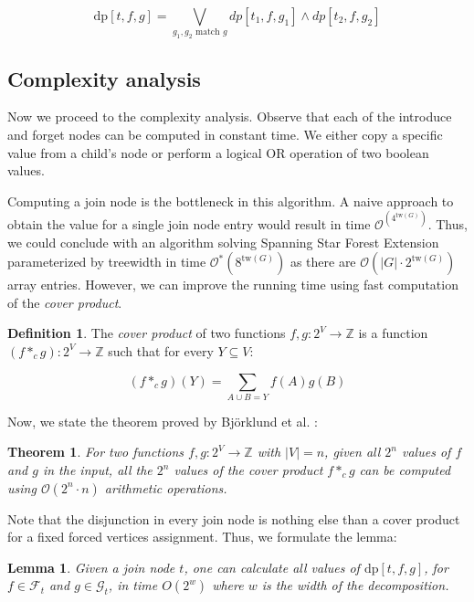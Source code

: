 \documentclass[en]{pracamgr}
\newtheorem{theorem}{Theorem}
\newtheorem{lemma}{Lemma}
\theoremstyle{definition}
\newtheorem{definition}{Definition}
\newcommand{\ssfep}{{\sc Spanning Star Forest Extension}}
\newcommand{\dpt}[1]{\textrm{dp}[#1]}
\newcommand{\tw}{\textrm{tw}}
\begin{document}
\begin{equation*}
	\dpt{t,f,g} =
		\bigvee\limits_{g_1,g_2 \text{ match $g$}} dp[t_1,f,g_1] \land dp[t_2,f,g_2]
\end{equation*}

\subsection{Complexity analysis}

Now we proceed to the complexity analysis. Observe that each of the introduce and forget nodes can be computed in constant time. We either copy a specific value from a child's node or perform a logical OR operation of two boolean values. 

Computing a join node is the bottleneck in this algorithm. A naive approach to obtain the value for a single join node entry would result in time $\mathcal{O}^(4^{\tw(G)})$. Thus, we could conclude with an algorithm solving \ssfep{} parameterized by treewidth in time $\mathcal{O}^*(8^{\tw(G)})$ as there are $\mathcal{O}(|G| \cdot 2^{\tw(G)})$ array entries. However, we can improve the running time using fast computation of the \textit{cover product}.

\begin{definition}
	The \textit{cover product} of two functions $f,g:2^V \rightarrow \mathbb{Z}$ is a function $(f *_c g):2^V \rightarrow \mathbb{Z}$ such that for every $Y \subseteq V$:
	
	\begin{equation*}
		(f *_c g)(Y) = \sum\limits_{ A \cup B = Y} f(A)g(B)
	\end{equation*}
\end{definition}

Now, we state the theorem proved by Björklund et al. \cite{CoverProduct}:

\begin{theorem}\label{cproduct}
	For two functions $f,g:2^V \rightarrow \mathbb{Z}$ with $|V|=n$, given all $2^n$ values of $f$ and $g$ in the input, all the $2^n$ values of the cover product $f*_cg$ can be computed using $\mathcal{O}(2^n\cdot n)$ arithmetic operations.
\end{theorem}

Note that the disjunction in every join node is nothing else than a cover product for a fixed forced vertices assignment. Thus, we formulate the lemma:

\begin{lemma}\label{join lemma}
	Given a join node $t$, one can calculate all values of $\dpt{t,f,g}$, for $f \in \mathcal{F}_t$ and $g \in \mathcal{G}_t$, in time $O(2^w)$ where $w$ is the width of the decomposition.
\end{lemma}
\end{document}
